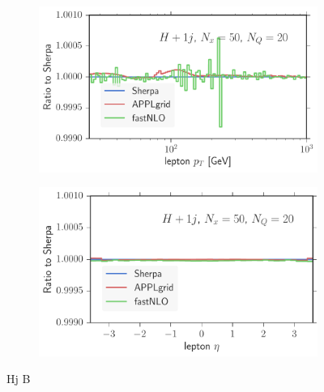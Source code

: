 \begin{figure}
\begin{subfigure}[]{0.49\textwidth}
	\includegraphics[width=\textwidth]{images/hjb_lpt.pdf}
\end{subfigure}
\begin{subfigure}[]{0.49\textwidth}
	\includegraphics[width=\textwidth]{images/hjb_leta.pdf}
\end{subfigure}
\caption{Hj B}
\end{figure}
%
